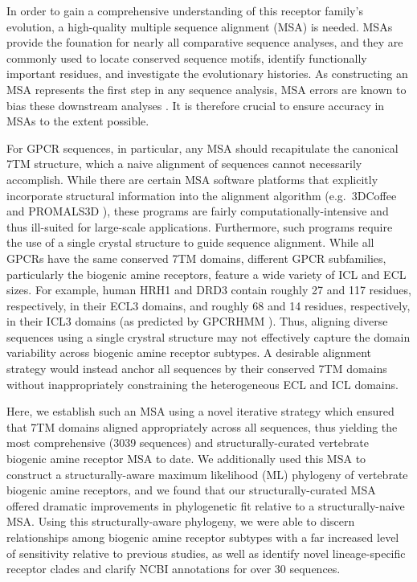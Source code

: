 \documentclass[fleqn,10pt]{wlpeerj}
\begin{document}
In order to gain a comprehensive understanding of this receptor family's evolution, a high-quality multiple sequence alignment (MSA) is needed. MSAs provide the founation for nearly all comparative sequence analyses, and they are commonly used to locate conserved sequence motifs, identify functionally important residues, and investigate the evolutionary histories. As constructing an MSA represents the first step in any sequence analysis, MSA errors are known to bias these downstream analyses \citep{Ogden2006, Wong2008, Jordan2012}. It is therefore crucial to ensure accuracy in MSAs to the extent possible. 

For GPCR sequences, in particular, any MSA should recapitulate the canonical 7TM structure, which a naive alignment of sequences cannot necessarily accomplish. While there are certain MSA software platforms that explicitly incorporate structural information into the alignment algorithm (e.g.\ 3DCoffee \citep{3dcoffee} and PROMALS3D \citep{promals3d}), these programs are fairly computationally-intensive and thus ill-suited for large-scale applications. Furthermore, such programs require the use of a single crystal structure to guide sequence alignment. While all GPCRs have the same conserved 7TM domains, different GPCR subfamilies, particularly the biogenic amine receptors, feature a wide variety of ICL and ECL sizes. For example, human HRH1 and DRD3 contain roughly 27 and 117 residues, respectively, in their ECL3 domains, and roughly 68 and 14 residues, respectively, in their ICL3 domains (as predicted by GPCRHMM \citep{Wistrand2006}). Thus, aligning diverse sequences using a single crystral structure may not effectively capture the domain variability across biogenic amine receptor subtypes. A desirable alignment strategy would instead anchor all sequences by their conserved 7TM domains without inappropriately constraining the heterogeneous ECL and ICL domains.

Here, we establish such an MSA using a novel iterative strategy which ensured that 7TM domains aligned appropriately across all sequences, thus yielding the most comprehensive (3039 sequences) and structurally-curated vertebrate biogenic amine receptor MSA to date. We additionally used this MSA to construct a structurally-aware maximum likelihood (ML) phylogeny of vertebrate biogenic amine receptors, and we found that our structurally-curated MSA offered dramatic improvements in phylogenetic fit relative to a structurally-naive MSA. Using this structurally-aware phylogeny, we were able to discern relationships among biogenic amine receptor subtypes with a far increased level of sensitivity relative to previous studies, as well as identify novel lineage-specific receptor clades and clarify NCBI annotations for over 30 sequences. 
\end{document}
